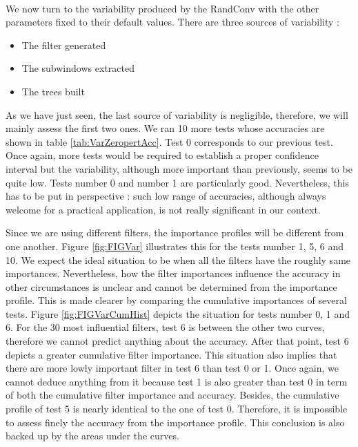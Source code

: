 \documentclass[a4paper]{report}
\begin{document}
		\paragraph{}
		We now turn to the variability produced by the RandConv with the other parameters fixed to their default values. There are three sources of variability :
		
		\begin{itemize}
			\item The filter generated
			\item The subwindows extracted
			\item The trees built
		\end{itemize}
		
		As we have just seen, the last source of variability is negligible, therefore, we will mainly assess the first two ones. We ran 10 more tests whose accuracies are shown in table \ref{tab:VarZeropertAcc}. Test 0 corresponds to our previous test. Once again, more tests would be required to establish a proper confidence interval but the variability, although more important than previously, seems to be quite low. Tests number 0 and number 1 are particularly good. Nevertheless, this has to be put in perspective : such low range of accuracies, although always welcome for a practical application, is not really significant in our context.
		\par
		Since we are using different filters, the importance profiles will be different from one another. Figure \ref{fig:FIGVar} illustrates this for the tests number 1, 5, 6 and 10. We expect the ideal situation to be when all the filters have the roughly same importances. Nevertheless, how the filter importances influence the accuracy in other circumstances is unclear and cannot be determined from the importance profile. This is made clearer by comparing the cumulative importances of several tests. Figure \ref{fig:FIGVarCumHist} depicts the situation for tests number 0, 1 and 6. For the 30 most influential filters, test 6 is between the other two curves, therefore we cannot predict anything about the accuracy. After that point, test 6 depicts a greater cumulative filter importance. This situation also implies that there are more lowly important filter in test 6 than test 0 or 1. Once again, we cannot deduce anything from it because test 1 is also greater than test 0 in term of both the cumulative filter importance and accuracy. Besides, the cumulative profile of test 5 is nearly identical to the one of test 0. Therefore, it is impossible to assess finely the accuracy from the importance profile. This conclusion is also backed up by the areas under the curves.
		
\end{document}
